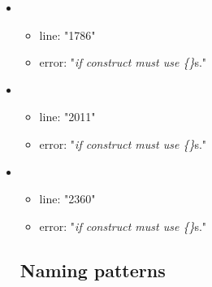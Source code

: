 \begin{itemize}
\begin{itemize}
	\end{itemize}
	\item 
	\begin{itemize} 
		\item line: "1786" 
		\item error: "\emph{if construct must use \{\}}s." 
	\end{itemize}
	\item 
	\begin{itemize} 
		\item line: "2011" 
		\item error: "\emph{if construct must use \{\}}s." 
	\end{itemize}
	\item 
	\begin{itemize} 
		\item line: "2360" 
		\item error: "\emph{if construct must use \{\}}s."
	\end{itemize}
\subsection{Naming patterns} %
\label{sub:naming_patterns}



\end{itemize}
